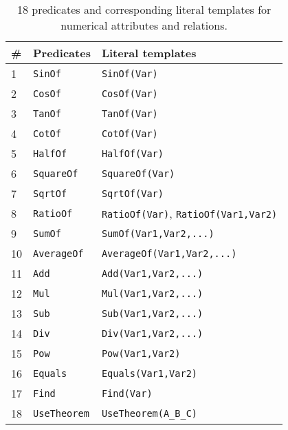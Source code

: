 \documentclass[11pt,a4paper]{article}
\begin{document}
\begin{table*}[ht]
\centering 
\footnotesize
\begin{tabular}{lll}
	\toprule
	\# & \textbf{Predicates} & \textbf{Literal templates} \\
	\midrule
	1 & \texttt{SinOf} & \texttt{SinOf(Var)} \\
	2 & \texttt{CosOf} & \texttt{CosOf(Var)} \\
	3 & \texttt{TanOf} & \texttt{TanOf(Var)}\\
	4 & \texttt{CotOf} & \texttt{CotOf(Var)} \\
	5 &	\texttt{HalfOf} & \texttt{HalfOf(Var)}\\
	6 & \texttt{SquareOf} & \texttt{SquareOf(Var)}\\
	7 & \texttt{SqrtOf} & \texttt{SqrtOf(Var)}\\
	8 & \texttt{RatioOf} & \texttt{RatioOf(Var)}, \texttt{RatioOf(Var1,Var2)}\\
	9 &\texttt{SumOf} & \texttt{SumOf(Var1,Var2,...)}\\
	10 & \texttt{AverageOf} & 	\texttt{AverageOf(Var1,Var2,...)}\\
	11 & \texttt{Add} & \texttt{Add(Var1,Var2,...)} \\
	12 & \texttt{Mul} & \texttt{Mul(Var1,Var2,...)}\\
	13 & \texttt{Sub} & \texttt{Sub(Var1,Var2,...)}\\
	14 & \texttt{Div} & \texttt{Div(Var1,Var2,...)}\\
	15 & \texttt{Pow} & \texttt{Pow(Var1,Var2)} \\
	16 & \texttt{Equals} & \texttt{Equals(Var1,Var2)}\\
	17 & \texttt{Find} & \texttt{Find(Var)}\\
	18 & \texttt{UseTheorem} & \texttt{UseTheorem(A\_B\_C)}\\
	\bottomrule
\end{tabular}
\caption{18 predicates and corresponding literal templates for  numerical attributes and relations.}
\label{appex:predicate6}
\end{table*}
\clearpage{}
\end{document}
